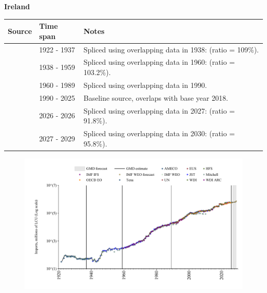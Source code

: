 \documentclass[12pt,a4paper,landscape]{article}
\begin{document}
\begin{adjustbox}{max totalsize={\paperwidth}{\paperheight},center}
\begin{minipage}[t][\textheight][t]{\textwidth}
\vspace*{0.5cm}
{}
\begin{center}
{\Large\bfseries Ireland}
\end{center}
\vspace{0.5cm}
\begin{table}[H]
\centering
\small
\begin{tabular}{|l|l|l|}
\hline
\textbf{Source} & \textbf{Time span} & \textbf{Notes} \\
\hline
\rowcolor{white}\cite{Tena}& 1922 - 1937 &Spliced using overlapping data in 1938: (ratio = 109\%).\\
\rowcolor{lightgray}\cite{JST}& 1938 - 1959 &Spliced using overlapping data in 1960: (ratio = 103.2\%).\\
\rowcolor{white}\cite{AMECO}& 1960 - 1989 &Spliced using overlapping data in 1990.\\
\rowcolor{lightgray}\cite{OECD_EO}& 1990 - 2025 &Baseline source, overlaps with base year 2018.\\
\rowcolor{white}\cite{AMECO}& 2026 - 2026 &Spliced using overlapping data in 2027: (ratio = 91.8\%).\\
\rowcolor{lightgray}\cite{IMF_WEO_forecast}& 2027 - 2029 &Spliced using overlapping data in 2030: (ratio = 95.8\%).\\
\hline
\end{tabular}
\end{table}
\begin{figure}[H]
\centering
\includegraphics[width=\textwidth,height=0.6\textheight,keepaspectratio]{graphs/IRL_imports.pdf}
\end{figure}
\end{minipage}
\end{adjustbox}
\end{document}

